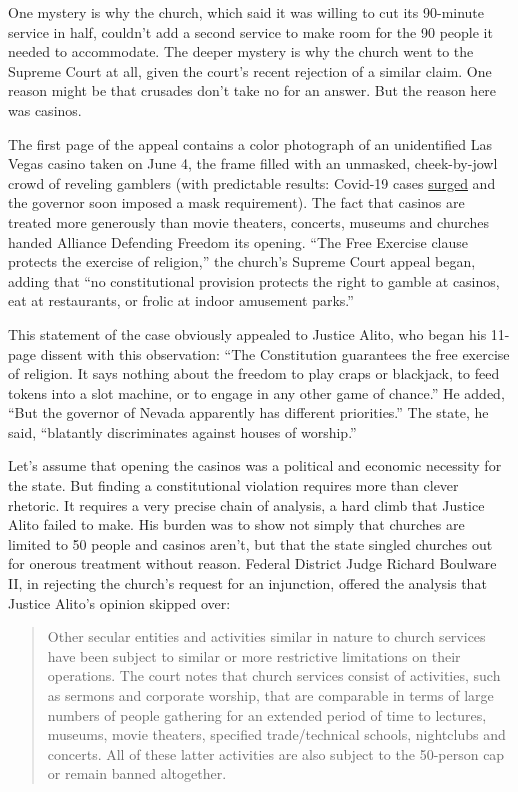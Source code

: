 One mystery is why the church, which said it was willing to cut its
90-minute service in half, couldn't add a second service to make room
for the 90 people it needed to accommodate. The deeper mystery is why
the church went to the Supreme Court at all, given the court's recent
rejection of a similar claim. One reason might be that crusades don't
take no for an answer. But the reason here was casinos.

The first page of the appeal contains a color photograph of an
unidentified Las Vegas casino taken on June 4, the frame filled with an
unmasked, cheek-by-jowl crowd of reveling gamblers (with predictable
results: Covid-19 cases
\href{https://thehill.com/changing-america/well-being/medical-advances/509247-over-a-hundred-coronavirus-cases-in-nevada}{surged}
and the governor soon imposed a mask requirement). The fact that casinos
are treated more generously than movie theaters, concerts, museums and
churches handed Alliance Defending Freedom its opening. ``The Free
Exercise clause protects the exercise of religion,'' the church's
Supreme Court appeal began, adding that ``no constitutional provision
protects the right to gamble at casinos, eat at restaurants, or frolic
at indoor amusement parks.''

This statement of the case obviously appealed to Justice Alito, who
began his 11-page dissent with this observation: ``The Constitution
guarantees the free exercise of religion. It says nothing about the
freedom to play craps or blackjack, to feed tokens into a slot machine,
or to engage in any other game of chance.'' He added, ``But the governor
of Nevada apparently has different priorities.'' The state, he said,
``blatantly discriminates against houses of worship.''

Let's assume that opening the casinos was a political and economic
necessity for the state. But finding a constitutional violation requires
more than clever rhetoric. It requires a very precise chain of analysis,
a hard climb that Justice Alito failed to make. His burden was to show
not simply that churches are limited to 50 people and casinos aren't,
but that the state singled churches out for onerous treatment without
reason. Federal District Judge Richard Boulware II, in rejecting the
church's request for an injunction, offered the analysis that Justice
Alito's opinion skipped over:

\begin{quote}
Other secular entities and activities similar in nature to church
services have been subject to similar or more restrictive limitations on
their operations. The court notes that church services consist of
activities, such as sermons and corporate worship, that are comparable
in terms of large numbers of people gathering for an extended period of
time to lectures, museums, movie theaters, specified trade/technical
schools, nightclubs and concerts. All of these latter activities are
also subject to the 50-person cap or remain banned altogether.
\end{quote}


